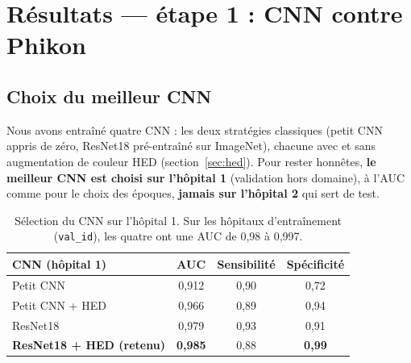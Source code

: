 \documentclass[11pt,a4paper]{article}
\newcommand{\best}[1]{\textbf{#1}}
\begin{document}
\section{Résultats — étape 1 : CNN contre Phikon}

\subsection{Choix du meilleur CNN}
Nous avons entraîné quatre CNN : les deux stratégies classiques (petit CNN appris de zéro, ResNet18 pré-entraîné sur ImageNet), chacune
avec et sans augmentation de couleur HED (section~\ref{sec:hed}). Pour rester honnêtes, \textbf{le meilleur CNN est choisi sur l'hôpital 1}
(validation hors domaine), à l'AUC comme pour le choix des époques, \textbf{jamais sur l'hôpital 2} qui sert de test.

\begin{table}[H]
\centering\small
\begin{tabular}{lccc}
\toprule
\textbf{CNN (hôpital 1)} & \textbf{AUC} & \textbf{Sensibilité} & \textbf{Spécificité} \\
\midrule
Petit CNN & 0,912 & 0,90 & 0,72 \\
Petit CNN + HED & 0,966 & 0,89 & 0,94 \\
ResNet18 & 0,979 & 0,93 & 0,91 \\
\rowcolor{bleuclair}\textbf{ResNet18 + HED (retenu)} & \best{0,985} & 0,88 & \best{0,99} \\
\bottomrule
\end{tabular}
\caption{Sélection du CNN sur l'hôpital 1. Sur les hôpitaux d'entraînement (\texttt{val\_id}), les quatre ont une AUC de 0,98 à 0,997.}
\label{tab:choixcnn}
\end{table}
\end{document}
